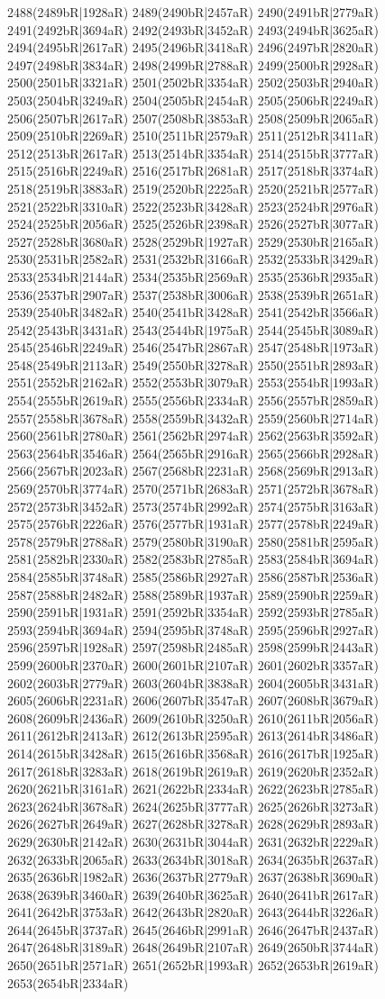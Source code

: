 2488(2489bR|1928aR) 2489(2490bR|2457aR) 2490(2491bR|2779aR) 2491(2492bR|3694aR) 2492(2493bR|3452aR) 2493(2494bR|3625aR) 2494(2495bR|2617aR) 2495(2496bR|3418aR) 2496(2497bR|2820aR) 2497(2498bR|3834aR) 2498(2499bR|2788aR) 2499(2500bR|2928aR) 2500(2501bR|3321aR) 2501(2502bR|3354aR) 2502(2503bR|2940aR) 2503(2504bR|3249aR) 2504(2505bR|2454aR) 2505(2506bR|2249aR) 2506(2507bR|2617aR) 2507(2508bR|3853aR) 2508(2509bR|2065aR) 2509(2510bR|2269aR) 2510(2511bR|2579aR) 2511(2512bR|3411aR) 2512(2513bR|2617aR) 2513(2514bR|3354aR) 2514(2515bR|3777aR) 2515(2516bR|2249aR) 2516(2517bR|2681aR) 2517(2518bR|3374aR) 2518(2519bR|3883aR) 2519(2520bR|2225aR) 2520(2521bR|2577aR) 2521(2522bR|3310aR) 2522(2523bR|3428aR) 2523(2524bR|2976aR) 2524(2525bR|2056aR) 2525(2526bR|2398aR) 2526(2527bR|3077aR) 2527(2528bR|3680aR) 2528(2529bR|1927aR) 2529(2530bR|2165aR) 2530(2531bR|2582aR) 2531(2532bR|3166aR) 2532(2533bR|3429aR) 2533(2534bR|2144aR) 2534(2535bR|2569aR) 2535(2536bR|2935aR) 2536(2537bR|2907aR) 2537(2538bR|3006aR) 2538(2539bR|2651aR) 2539(2540bR|3482aR) 2540(2541bR|3428aR) 2541(2542bR|3566aR) 2542(2543bR|3431aR) 2543(2544bR|1975aR) 2544(2545bR|3089aR) 2545(2546bR|2249aR) 2546(2547bR|2867aR) 2547(2548bR|1973aR) 2548(2549bR|2113aR) 2549(2550bR|3278aR) 2550(2551bR|2893aR) 2551(2552bR|2162aR) 2552(2553bR|3079aR) 2553(2554bR|1993aR) 2554(2555bR|2619aR) 2555(2556bR|2334aR) 2556(2557bR|2859aR) 2557(2558bR|3678aR) 2558(2559bR|3432aR) 2559(2560bR|2714aR) 2560(2561bR|2780aR) 2561(2562bR|2974aR) 2562(2563bR|3592aR) 2563(2564bR|3546aR) 2564(2565bR|2916aR) 2565(2566bR|2928aR) 2566(2567bR|2023aR) 2567(2568bR|2231aR) 2568(2569bR|2913aR) 2569(2570bR|3774aR) 2570(2571bR|2683aR) 2571(2572bR|3678aR) 2572(2573bR|3452aR) 2573(2574bR|2992aR) 2574(2575bR|3163aR) 2575(2576bR|2226aR) 2576(2577bR|1931aR) 2577(2578bR|2249aR) 2578(2579bR|2788aR) 2579(2580bR|3190aR) 2580(2581bR|2595aR) 2581(2582bR|2330aR) 2582(2583bR|2785aR) 2583(2584bR|3694aR) 2584(2585bR|3748aR) 2585(2586bR|2927aR) 2586(2587bR|2536aR) 2587(2588bR|2482aR) 2588(2589bR|1937aR) 2589(2590bR|2259aR) 2590(2591bR|1931aR) 2591(2592bR|3354aR) 2592(2593bR|2785aR) 2593(2594bR|3694aR) 2594(2595bR|3748aR) 2595(2596bR|2927aR) 2596(2597bR|1928aR) 2597(2598bR|2485aR) 2598(2599bR|2443aR) 2599(2600bR|2370aR) 2600(2601bR|2107aR) 2601(2602bR|3357aR) 2602(2603bR|2779aR) 2603(2604bR|3838aR) 2604(2605bR|3431aR) 2605(2606bR|2231aR) 2606(2607bR|3547aR) 2607(2608bR|3679aR) 2608(2609bR|2436aR) 2609(2610bR|3250aR) 2610(2611bR|2056aR) 2611(2612bR|2413aR) 2612(2613bR|2595aR) 2613(2614bR|3486aR) 2614(2615bR|3428aR) 2615(2616bR|3568aR) 2616(2617bR|1925aR) 2617(2618bR|3283aR) 2618(2619bR|2619aR) 2619(2620bR|2352aR) 2620(2621bR|3161aR) 2621(2622bR|2334aR) 2622(2623bR|2785aR) 2623(2624bR|3678aR) 2624(2625bR|3777aR) 2625(2626bR|3273aR) 2626(2627bR|2649aR) 2627(2628bR|3278aR) 2628(2629bR|2893aR) 2629(2630bR|2142aR) 2630(2631bR|3044aR) 2631(2632bR|2229aR) 2632(2633bR|2065aR) 2633(2634bR|3018aR) 2634(2635bR|2637aR) 2635(2636bR|1982aR) 2636(2637bR|2779aR) 2637(2638bR|3690aR) 2638(2639bR|3460aR) 2639(2640bR|3625aR) 2640(2641bR|2617aR) 2641(2642bR|3753aR) 2642(2643bR|2820aR) 2643(2644bR|3226aR) 2644(2645bR|3737aR) 2645(2646bR|2991aR) 2646(2647bR|2437aR) 2647(2648bR|3189aR) 2648(2649bR|2107aR) 2649(2650bR|3744aR) 2650(2651bR|2571aR) 2651(2652bR|1993aR) 2652(2653bR|2619aR) 2653(2654bR|2334aR) 